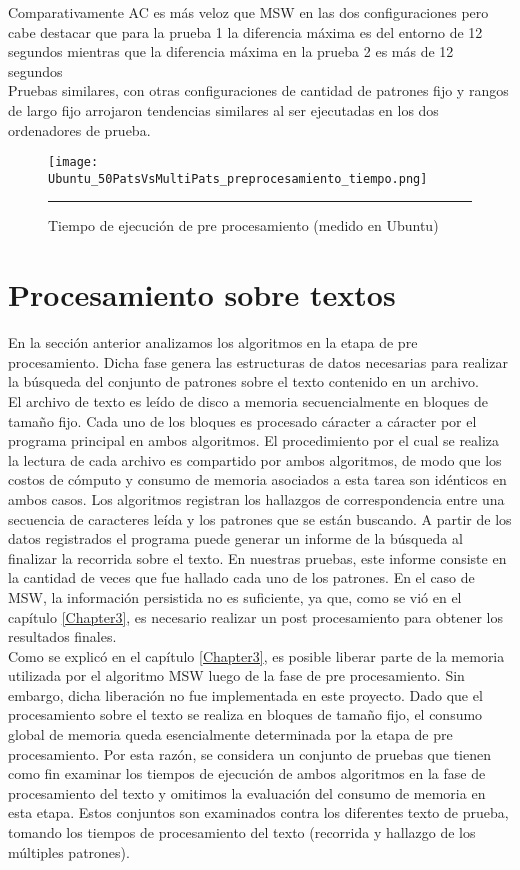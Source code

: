 {Comparativamente AC es más veloz que MSW en las dos configuraciones pero cabe destacar que para la prueba 1 la diferencia máxima es del entorno de 12 segundos mientras que la diferencia máxima en la prueba 2 es más de 12 segundos\\
Pruebas similares, con otras configuraciones de cantidad de patrones fijo y rangos de largo fijo arrojaron tendencias similares al ser ejecutadas en los dos ordenadores de prueba.\\
\begin{figure}[htbp]
	\centering
		\texttt{[image: Ubuntu\_50PatsVsMultiPats\_preprocesamiento\_tiempo.png]}
		\rule{35em}{0.5pt}
	\caption[gráfica tiempo de ejecución de pre procesamiento]{Tiempo de ejecución de pre procesamiento (medido en Ubuntu)}
	\label{fig:Tiempo50PatsVsMultiPats}
\end{figure}
\section{Procesamiento sobre textos}
\label{sec:procesamiento}
En la sección anterior analizamos los algoritmos en la etapa de pre procesamiento. Dicha fase genera las estructuras de datos necesarias para realizar la búsqueda del conjunto de patrones sobre el texto contenido en un archivo.\\
El archivo de texto es leído de disco a memoria secuencialmente en bloques de tamaño fijo. Cada uno de los bloques es procesado cáracter a cáracter por el programa principal en ambos algoritmos. El procedimiento por el cual se realiza la lectura de cada archivo es compartido por ambos algoritmos, de modo que los costos de cómputo y consumo de memoria  asociados a esta tarea son idénticos en ambos casos. 
Los algoritmos registran los hallazgos de correspondencia entre una secuencia de caracteres leída y los patrones que se están buscando. A partir de los datos registrados el programa puede generar un informe de la búsqueda al finalizar la recorrida sobre el texto. En nuestras pruebas, este informe consiste en la cantidad de veces que fue hallado cada uno de los patrones. En el caso de MSW, la información persistida no es suficiente, ya que, como se vió en el capítulo \ref{Chapter3}, es necesario realizar un post procesamiento para obtener los resultados finales.\\
Como se explicó en el capítulo \ref{Chapter3}, es posible liberar parte de la memoria utilizada por el algoritmo MSW luego de la fase de pre procesamiento. Sin embargo, dicha liberación no fue implementada en este proyecto. Dado que el procesamiento sobre el texto se realiza en bloques de tamaño fijo, el consumo global de memoria queda esencialmente determinada por la etapa de pre procesamiento.
Por esta razón, se considera un conjunto de pruebas que tienen como fin examinar los tiempos de ejecución de ambos algoritmos en la fase de procesamiento del texto y omitimos la evaluación del consumo de memoria en esta etapa.
Estos conjuntos son examinados contra los diferentes texto de prueba, tomando los tiempos de procesamiento del texto (recorrida y hallazgo de los múltiples patrones). 

}
